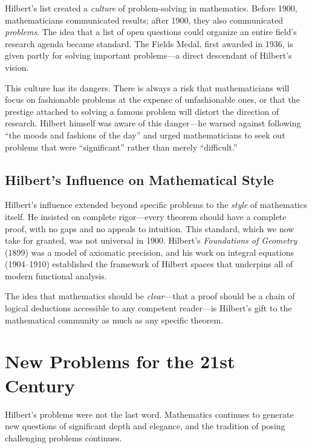 Hilbert's list created a \emph{culture} of problem-solving in mathematics. Before 1900, mathematicians communicated results; after 1900, they also communicated \emph{problems}. The idea that a list of open questions could organize an entire field's research agenda became standard. The Fields Medal, first awarded in 1936, is given partly for solving important problems---a direct descendant of Hilbert's vision.

This culture has its dangers. There is always a risk that mathematicians will focus on fashionable problems at the expense of unfashionable ones, or that the prestige attached to solving a famous problem will distort the direction of research. Hilbert himself was aware of this danger---he warned against following ``the moods and fashions of the day'' and urged mathematicians to seek out problems that were ``significant'' rather than merely ``difficult.''

\subsection{Hilbert's Influence on Mathematical Style}

Hilbert's influence extended beyond specific problems to the \emph{style} of mathematics itself. He insisted on complete rigor---every theorem should have a complete proof, with no gaps and no appeals to intuition. This standard, which we now take for granted, was not universal in 1900. Hilbert's \emph{Foundations of Geometry} (1899) was a model of axiomatic precision, and his work on integral equations (1904--1910) established the framework of Hilbert spaces that underpins all of modern functional analysis.

The idea that mathematics should be \emph{clear}---that a proof should be a chain of logical deductions accessible to any competent reader---is Hilbert's gift to the mathematical community as much as any specific theorem.

\section{New Problems for the 21st Century}

Hilbert's problems were not the last word. Mathematics continues to generate new questions of significant depth and elegance, and the tradition of posing challenging problems continues.

